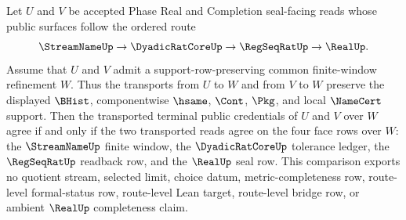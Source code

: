 \begin{theorem}
\label{thm:streamname-l10-ordered-exit-common-refinement-naturality}
Let $U$ and $V$ be accepted Phase Real and Completion seal-facing reads whose public surfaces follow the ordered route
$$
\StreamNameUp \to \DyadicRatCoreUp \to \RegSeqRatUp \to \RealUp .
$$
Assume that $U$ and $V$ admit a support-row-preserving common finite-window refinement $W$. Thus the transports from $U$ to $W$ and from $V$ to $W$ preserve the displayed $\BHist$, componentwise $\hsame$, $\Cont$, $\Pkg$, and local $\NameCert$ support. Then the transported terminal public credentials of $U$ and $V$ over $W$ agree if and only if the two transported reads agree on the four face rows over $W$: the $\StreamNameUp$ finite window, the $\DyadicRatCoreUp$ tolerance ledger, the $\RegSeqRatUp$ readback row, and the $\RealUp$ seal row. This comparison exports no quotient stream, selected limit, choice datum, metric-completeness row, route-level formal-status row, route-level Lean target, route-level bridge row, or ambient $\RealUp$ completeness claim.
\end{theorem}
